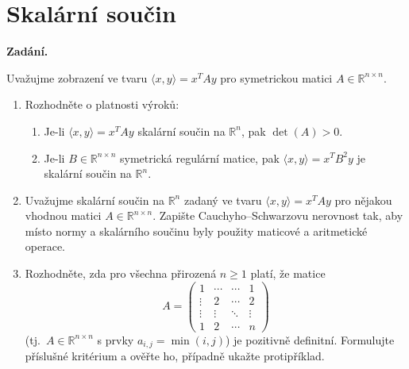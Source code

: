 \section{Skalární součin}

\noindent\textbf{Zadání.}\par
Uvažujme zobrazení ve tvaru $\langle x, y \rangle = x^T A y$ pro symetrickou matici $A \in \mathbb{R}^{n \times n}$.
\begin{enumerate}
  \item Rozhodněte o platnosti výroků:
    \begin{enumerate}
      \item[(a)] Je-li $\langle x, y \rangle = x^T A y$ skalární součin na $\mathbb{R}^n$, pak $\det(A) > 0$.
      \item[(b)] Je-li $B \in \mathbb{R}^{n \times n}$ symetrická regulární matice, pak $\langle x, y \rangle = x^T B^2 y$ je skalární součin na $\mathbb{R}^n$.
    \end{enumerate}
  \item Uvažujme skalární součin na $\mathbb{R}^n$ zadaný ve tvaru $\langle x, y \rangle = x^T A y$ pro nějakou vhodnou matici $A \in \mathbb{R}^{n \times n}$. Zapište Cauchyho--Schwarzovu nerovnost tak, aby místo normy a skalárního součinu byly použity maticové a aritmetické operace.
  \item Rozhodněte, zda pro všechna přirozená $n \ge 1$ platí, že matice
    \[
      A = \begin{pmatrix}
        1 & \cdots & \cdots & 1 \\
        \vdots & 2 & \cdots & 2 \\
        \vdots & \vdots & \ddots & \vdots \\
        1 & 2 & \cdots & n
      \end{pmatrix}
    \]
    (tj.\ $A \in \mathbb{R}^{n \times n}$ s prvky $a_{i,j} = \min(i,j)$) je pozitivně definitní. Formulujte příslušné kritérium a ověřte ho, případně ukažte protipříklad.
\end{enumerate}

